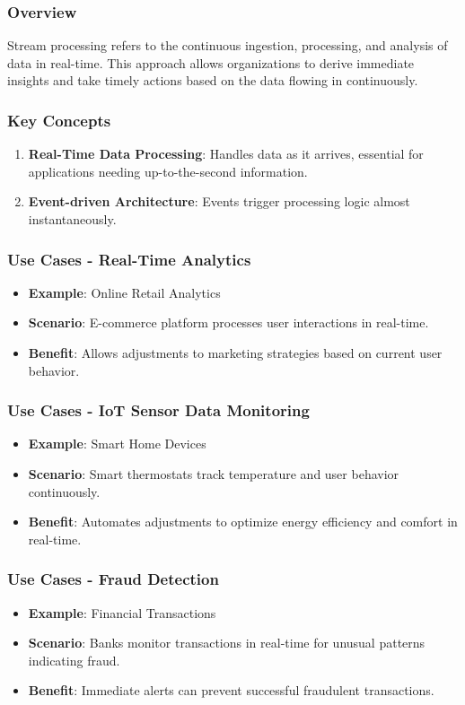 \documentclass[aspectratio=169]{beamer}
\begin{document}
\begin{frame}[fragile]
    \frametitle{Overview}
    Stream processing refers to the continuous ingestion, processing, and analysis of data in real-time. This approach allows organizations to derive immediate insights and take timely actions based on the data flowing in continuously.
\end{frame}

\begin{frame}[fragile]
    \frametitle{Key Concepts}
    \begin{enumerate}
        \item \textbf{Real-Time Data Processing}: Handles data as it arrives, essential for applications needing up-to-the-second information.
        \item \textbf{Event-driven Architecture}: Events trigger processing logic almost instantaneously.
    \end{enumerate}
\end{frame}

\begin{frame}[fragile]
    \frametitle{Use Cases - Real-Time Analytics}
    \begin{itemize}
        \item \textbf{Example}: Online Retail Analytics
        \item \textbf{Scenario}: E-commerce platform processes user interactions in real-time.
        \item \textbf{Benefit}: Allows adjustments to marketing strategies based on current user behavior.
    \end{itemize}
\end{frame}

\begin{frame}[fragile]
    \frametitle{Use Cases - IoT Sensor Data Monitoring}
    \begin{itemize}
        \item \textbf{Example}: Smart Home Devices
        \item \textbf{Scenario}: Smart thermostats track temperature and user behavior continuously.
        \item \textbf{Benefit}: Automates adjustments to optimize energy efficiency and comfort in real-time.
    \end{itemize}
\end{frame}

\begin{frame}[fragile]
    \frametitle{Use Cases - Fraud Detection}
    \begin{itemize}
        \item \textbf{Example}: Financial Transactions
        \item \textbf{Scenario}: Banks monitor transactions in real-time for unusual patterns indicating fraud.
        \item \textbf{Benefit}: Immediate alerts can prevent successful fraudulent transactions.
    \end{itemize}
\end{frame}
\end{document}
